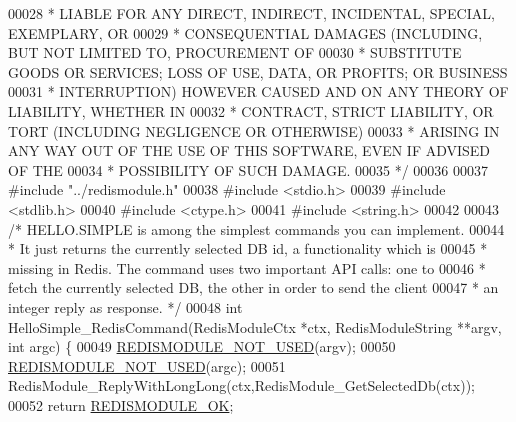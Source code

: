 \begin{DoxyCode}
00028 \textcolor{comment}{ * LIABLE FOR ANY DIRECT, INDIRECT, INCIDENTAL, SPECIAL, EXEMPLARY, OR}
00029 \textcolor{comment}{ * CONSEQUENTIAL DAMAGES (INCLUDING, BUT NOT LIMITED TO, PROCUREMENT OF}
00030 \textcolor{comment}{ * SUBSTITUTE GOODS OR SERVICES; LOSS OF USE, DATA, OR PROFITS; OR BUSINESS}
00031 \textcolor{comment}{ * INTERRUPTION) HOWEVER CAUSED AND ON ANY THEORY OF LIABILITY, WHETHER IN}
00032 \textcolor{comment}{ * CONTRACT, STRICT LIABILITY, OR TORT (INCLUDING NEGLIGENCE OR OTHERWISE)}
00033 \textcolor{comment}{ * ARISING IN ANY WAY OUT OF THE USE OF THIS SOFTWARE, EVEN IF ADVISED OF THE}
00034 \textcolor{comment}{ * POSSIBILITY OF SUCH DAMAGE.}
00035 \textcolor{comment}{ */}
00036 
00037 \textcolor{preprocessor}{#}\textcolor{preprocessor}{include} \textcolor{preprocessor}{"../redismodule.h"}
00038 \textcolor{preprocessor}{#}\textcolor{preprocessor}{include} \textcolor{preprocessor}{<}\textcolor{preprocessor}{stdio}\textcolor{preprocessor}{.}\textcolor{preprocessor}{h}\textcolor{preprocessor}{>}
00039 \textcolor{preprocessor}{#}\textcolor{preprocessor}{include} \textcolor{preprocessor}{<}\textcolor{preprocessor}{stdlib}\textcolor{preprocessor}{.}\textcolor{preprocessor}{h}\textcolor{preprocessor}{>}
00040 \textcolor{preprocessor}{#}\textcolor{preprocessor}{include} \textcolor{preprocessor}{<}\textcolor{preprocessor}{ctype}\textcolor{preprocessor}{.}\textcolor{preprocessor}{h}\textcolor{preprocessor}{>}
00041 \textcolor{preprocessor}{#}\textcolor{preprocessor}{include} \textcolor{preprocessor}{<}\textcolor{preprocessor}{string}\textcolor{preprocessor}{.}\textcolor{preprocessor}{h}\textcolor{preprocessor}{>}
00042 
00043 \textcolor{comment}{/* HELLO.SIMPLE is among the simplest commands you can implement.}
00044 \textcolor{comment}{ * It just returns the currently selected DB id, a functionality which is}
00045 \textcolor{comment}{ * missing in Redis. The command uses two important API calls: one to}
00046 \textcolor{comment}{ * fetch the currently selected DB, the other in order to send the client}
00047 \textcolor{comment}{ * an integer reply as response. */}
00048 \textcolor{keywordtype}{int} HelloSimple\_RedisCommand(RedisModuleCtx *ctx, RedisModuleString **argv, \textcolor{keywordtype}{int} argc) \{
00049     \hyperlink{redismodule_8h_a46d75d81383a00bd6b941af6cadf64c2}{REDISMODULE\_NOT\_USED}(argv);
00050     \hyperlink{redismodule_8h_a46d75d81383a00bd6b941af6cadf64c2}{REDISMODULE\_NOT\_USED}(argc);
00051     RedisModule\_ReplyWithLongLong(ctx,RedisModule\_GetSelectedDb(ctx));
00052     \textcolor{keywordflow}{return} \hyperlink{redismodule_8h_a1bc5bfd69abcd378ff52c640adc5418d}{REDISMODULE\_OK};

\end{DoxyCode}
